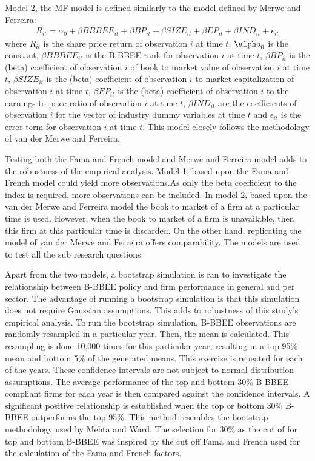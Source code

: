 Model 2, the MF model is defined similarly to the model defined by Merwe and Ferreira:
\begin{equation}
\begin{aligned} %
    R_{it} = \alpha_0 + \beta BBBEE_{it} + \beta BP_{it} + \beta SIZE_{it}     + \beta EP_{it} + \beta IND_{it} + \epsilon_{it}
\end{aligned}
\end{equation}
where $R_{it}$ is the share price return of observation $i$ at time $t$, $\alpho_0$ is the constant, $\beta BBBEE_{it}$ is the B-BBEE rank  for observation $i$ at time $t$, $\beta BP_{it}$ is the (beta) coefficient of observation $i$ of book to market value of observation $i$ at time $t$, $\beta SIZE_{it}$ is the (beta) coefficient of observation $i$ to market capitalization of observation $i$ at time $t$, $\beta EP_{it}$ is the (beta) coefficient of observation $i$ to the earnings to price ratio of observation $i$ at time $t$, $\beta IND_{it}$ are the coefficients of observation $i$ for the vector of industry dummy variables at time $t$ and $\epsilon_{it}$ is the error term for observation $i$ at time $t$. This model closely follows the methodology of van der Merwe and Ferreira. 

Testing both the Fama and French model and Merwe and Ferreira model adds to the robustness of the empirical analysis. Model 1, based upon the Fama and French model could yield more observations.As only the beta coefficient to the index is required, more observations can be included. In model 2, based upon the van der Merwe and Ferreira model the book to market of a firm at a particular time is used. However, when the book to market of a firm is unavailable, then this firm at this particular time is discarded. On the other hand,  replicating the model of van der Merwe and Ferreira offers comparability. The models are used to test all the sub research questions.

Apart from the two models, a bootstrap simulation is ran to investigate the relationship between B-BBEE policy and firm performance in general and per sector. The advantage of running a bootstrap simulation is that this simulation does not require Gaussian assumptions. This adds to robustness of this study’s empirical analysis. To run the bootstrap simulation, B-BBEE observations are randomly resampled in a particular year. Then, the mean is calculated. This resampling is done 10,000 times for this particular year, resulting in a top 95\% mean and bottom 5\% of the generated means. This exercise is repeated for each of the years. These confidence intervals are not subject to normal distribution assumptions. The average performance of the top and bottom 30\% B-BBEE compliant firms for each year is then compared against the confidence intervals. A significant positive relationship is established when the top or bottom 30\% B-BBEE outperforms the top 95\%. This method resembles the bootstrap methodology used by Mehta and Ward. The selection for 30\% as the cut of for top and bottom B-BBEE was inspired by the cut off Fama and French used for the calculation of the Fama and French factors.
